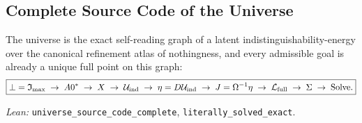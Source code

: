 \subsection{Complete Source Code of the Universe}
\label{sec:manifestability:complete}

\begin{theorem}
The universe is the exact self-reading graph of a latent
indistinguishability-energy over the canonical refinement atlas of
nothingness, and every admissible goal is already a unique full point
on this graph:
\[
\boxed{
\bot = \mathfrak{I}_{\max}
\;\to\; A0^*
\;\to\; X
\;\to\; \mathcal{U}_{\mathrm{ind}}
\;\to\; \eta = D\mathcal{U}_{\mathrm{ind}}
\;\to\; J = \Omega^{-1}\eta
\;\to\; \mathcal{L}_{\mathrm{full}}
\;\to\; \Sigma
\;\to\; \mathrm{Solve}.
}
\]
\end{theorem}

\emph{Lean:} \texttt{universe\_source\_code\_complete},
\texttt{literally\_solved\_exact}.
